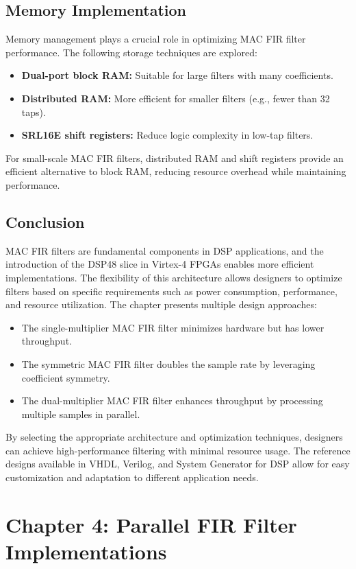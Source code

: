 \documentclass{article}
\begin{document}
	\subsection{Memory Implementation}
	Memory management plays a crucial role in optimizing MAC FIR filter performance. The following storage techniques are explored:
	\begin{itemize}
		\item \textbf{Dual-port block RAM:} Suitable for large filters with many coefficients.
		\item \textbf{Distributed RAM:} More efficient for smaller filters (e.g., fewer than 32 taps).
		\item \textbf{SRL16E shift registers:} Reduce logic complexity in low-tap filters.
	\end{itemize}
	For small-scale MAC FIR filters, distributed RAM and shift registers provide an efficient alternative to block RAM, reducing resource overhead while maintaining performance.
	
	\subsection{Conclusion}
	MAC FIR filters are fundamental components in DSP applications, and the introduction of the DSP48 slice in Virtex-4 FPGAs enables more efficient implementations. The flexibility of this architecture allows designers to optimize filters based on specific requirements such as power consumption, performance, and resource utilization. The chapter presents multiple design approaches:
	\begin{itemize}
		\item The single-multiplier MAC FIR filter minimizes hardware but has lower throughput.
		\item The symmetric MAC FIR filter doubles the sample rate by leveraging coefficient symmetry.
		\item The dual-multiplier MAC FIR filter enhances throughput by processing multiple samples in parallel.
	\end{itemize}
	By selecting the appropriate architecture and optimization techniques, designers can achieve high-performance filtering with minimal resource usage. The reference designs available in VHDL, Verilog, and System Generator for DSP allow for easy customization and adaptation to different application needs.
	
	\newpage
	
	\section{Chapter 4: Parallel FIR Filter Implementations}
	
\end{document}
